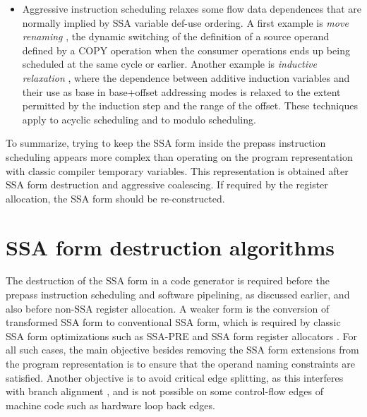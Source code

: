 \begin{itemize}
\item Aggressive instruction scheduling relaxes some flow data dependences that
are normally implied by SSA variable def-use ordering. A first example is
\emph{move renaming} \cite{Young:1998:MICRO}, the dynamic switching of the
definition of a source operand defined by a COPY operation when the consumer
operations ends up being scheduled at the same cycle or earlier. Another example
is \emph{inductive relaxation} \cite{Dinechin:1997:PaCT}, where the dependence
between additive induction variables and their use as base in base+offset
addressing modes is relaxed to the extent permitted by the induction step and
the range of the offset. These techniques apply to acyclic scheduling and to
modulo scheduling.

\end{itemize}

To summarize, trying to keep the SSA form inside the prepass instruction scheduling
appears more complex than operating on the program representation with classic
compiler temporary variables. This representation is obtained after SSA form
destruction and aggressive coalescing. If required by the register allocation,
the SSA form should be re-constructed.


\section{SSA form destruction algorithms} \label{sec:ssa-destruction}


The destruction of the SSA form in a code generator is required before the
prepass instruction scheduling and software pipelining, as discussed earlier,
and also before non-SSA register allocation.  A weaker form is the conversion of
transformed SSA form to conventional SSA form, which is required by classic SSA
form optimizations such as SSA-PRE \cite{Kennedy:1999:TOPLAS} and SSA form
register allocators \cite{Pereira:2008:PLDI}. For all such cases, the main
objective besides removing the SSA form extensions from the program
representation is to ensure that the operand naming constraints are satisfied.
Another objective is to avoid critical edge splitting, as this interferes with
branch alignment \cite{Calder:1994:ASPLOS}, and is not possible on some
control-flow edges of machine code such as hardware loop back edges.

